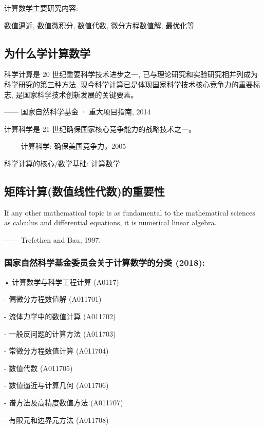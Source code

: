 \documentclass[12pt,a4paper]{article}
\begin{document}
\begin{framed}
	
	计算数学主要研究内容:
	
	数值逼近, 数值微积分, 数值代数, 微分方程数值解, 最优化等

\end{framed}

\subsection{为什么学计算数学}
科学计算是 20 世纪重要科学技术进步之一, 已与理论研究和实验研究相并列成为科学研究的第三种方法. 现今科学计算已是体现国家科学技术核心竞争力的重要标志, 是国家科学技术创新发展的关键要素。

\qquad \qquad \qquad \qquad \qquad \qquad \qquad \qquad —— 国家自然科学基金 · 重大项目指南, 2014

计算科学是 21 世纪确保国家核心竞争能力的战略技术之一。

\qquad \qquad \qquad \qquad \qquad \qquad \qquad \qquad  —— 计算科学: 确保美国竞争力，2005

科学计算的核心/数学基础: 计算数学.

\subsection{矩阵计算(数值线性代数)的重要性}
If any other mathematical topic is as fundamental to the mathematical
sciences as calculus and differential equations, it is numerical linear
algebra.

\qquad \qquad \qquad \qquad \qquad \qquad \qquad\qquad—— Trefethen and Bau, 1997.

\subsubsection*{国家自然科学基金委员会关于计算数学的分类 (2018):}

• 计算数学与科学工程计算 (A0117)

- 偏微分方程数值解 (A011701)

- 流体力学中的数值计算 (A011702)

- 一般反问题的计算方法 (A011703)

- 常微分方程数值计算 (A011704)

- 数值代数 (A011705)

- 数值逼近与计算几何 (A011706)

- 谱方法及高精度数值方法 (A011707)

- 有限元和边界元方法 (A011708)
\end{document}
